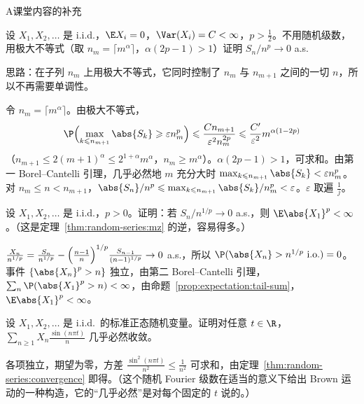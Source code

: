 \begin{exercises}{A}{课堂内容的补充}
\item\label{ex:random-series:A1} 设 $X_1,X_2,\dots$ 是 i.i.d.，$\E X_i=0$，$\Var(X_i)=C<\infty$，$p>\frac12$。不用随机级数，用极大不等式（取 $n_m=\lceil m^\alpha\rceil$，$\alpha(2p-1)>1$）证明 $S_n/n^p\to0$ a.s.
\begin{solution}
思路：在子列 $n_m$ 上用极大不等式，它同时控制了 $n_m$ 与 $n_{m+1}$ 之间的一切 $n$，所以不再需要单调性。

令 $n_m=\lceil m^\alpha\rceil$。由极大不等式，
\[
\P\Bigl(\max_{k\leqslant n_{m+1}}\abs{S_k}\geqslant\varepsilon n_m^p\Bigr)\leqslant\frac{Cn_{m+1}}{\varepsilon^2n_m^{2p}}\leqslant\frac{C'}{\varepsilon^2}m^{\alpha(1-2p)}
\]
（$n_{m+1}\leqslant2(m+1)^\alpha\leqslant2^{1+\alpha}m^\alpha$，$n_m\geqslant m^\alpha$）。$\alpha(2p-1)>1$，可求和。由第一 Borel--Cantelli 引理，几乎必然地 $m$ 充分大时 $\max_{k\leqslant n_{m+1}}\abs{S_k}<\varepsilon n_m^p$。对 $n_m\leqslant n<n_{m+1}$，$\abs{S_n}/n^p\leqslant\max_{k\leqslant n_{m+1}}\abs{S_k}/n_m^p<\varepsilon$。$\varepsilon$ 取遍 $\frac1j$。
\end{solution}

\item\label{ex:random-series:A2} 设 $X_1,X_2,\dots$ 是 i.i.d.，$p>0$。证明：若 $S_n/n^{1/p}\to0$ a.s.，则 $\E\abs{X_1}^p<\infty$。（这是定理~\ref{thm:random-series:mz} 的逆，容易得多。）
\begin{solution}
$\frac{X_n}{n^{1/p}}=\frac{S_n}{n^{1/p}}-\Bigl(\frac{n-1}n\Bigr)^{1/p}\frac{S_{n-1}}{(n-1)^{1/p}}\to0$ a.s.，所以 $\P(\abs{X_n}>n^{1/p}\ \text{i.o.})=0$。事件 $\{\abs{X_n}^p>n\}$ 独立，由第二 Borel--Cantelli 引理，$\sum_n\P(\abs{X_1}^p>n)<\infty$，由命题~\ref{prop:expectation:tail-sum}，$\E\abs{X_1}^p<\infty$。
\end{solution}

\item\label{ex:random-series:A3} 设 $X_1,X_2,\dots$ 是 i.i.d.\ 的标准正态随机变量。证明对任意 $t\in\R$，$\sum_{n\geqslant1}X_n\frac{\sin(n\pi t)}n$ 几乎必然收敛。
\begin{solution}
各项独立，期望为零，方差 $\frac{\sin^2(n\pi t)}{n^2}\leqslant\frac1{n^2}$ 可求和，由定理~\ref{thm:random-series:convergence} 即得。（这个随机 Fourier 级数在适当的意义下给出 Brown 运动的一种构造，它的“几乎必然”是对每个固定的 $t$ 说的。）
\end{solution}


\end{exercises}
